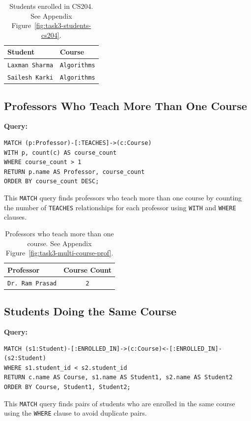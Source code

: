 \begin{table}[H]
  \centering
  \caption{Students enrolled in CS204. See Appendix Figure~\ref{fig:task3-students-cs204}.}
  \begin{tabular}{|l|l|}
    \hline
    \textbf{Student} & \textbf{Course} \\
    \hline
    \texttt{Laxman Sharma} & \texttt{Algorithms} \\
    \texttt{Sailesh Karki} & \texttt{Algorithms} \\
    \hline
  \end{tabular}
\end{table}

\subsection{Professors Who Teach More Than One Course}
\textbf{Query:}
\begin{verbatim}
MATCH (p:Professor)-[:TEACHES]->(c:Course)
WITH p, count(c) AS course_count
WHERE course_count > 1
RETURN p.name AS Professor, course_count
ORDER BY course_count DESC;
\end{verbatim}
This \texttt{MATCH} query finds professors who teach more than one course by counting the number of \texttt{TEACHES} relationships for each professor using \texttt{WITH} and \texttt{WHERE} clauses.

\begin{table}[H]
  \centering
  \caption{Professors who teach more than one course. See Appendix Figure~\ref{fig:task3-multi-course-prof}.}
  \begin{tabular}{|l|c|}
    \hline
    \textbf{Professor} & \textbf{Course Count} \\
    \hline
    \texttt{Dr. Ram Prasad} & \texttt{2} \\
    \hline
  \end{tabular}
\end{table}

\subsection{Students Doing the Same Course}
\textbf{Query:}
\begin{verbatim}
MATCH (s1:Student)-[:ENROLLED_IN]->(c:Course)<-[:ENROLLED_IN]-(s2:Student)
WHERE s1.student_id < s2.student_id
RETURN c.name AS Course, s1.name AS Student1, s2.name AS Student2
ORDER BY Course, Student1, Student2;
\end{verbatim}
This \texttt{MATCH} query finds pairs of students who are enrolled in the same course using the \texttt{WHERE} clause to avoid duplicate pairs.

